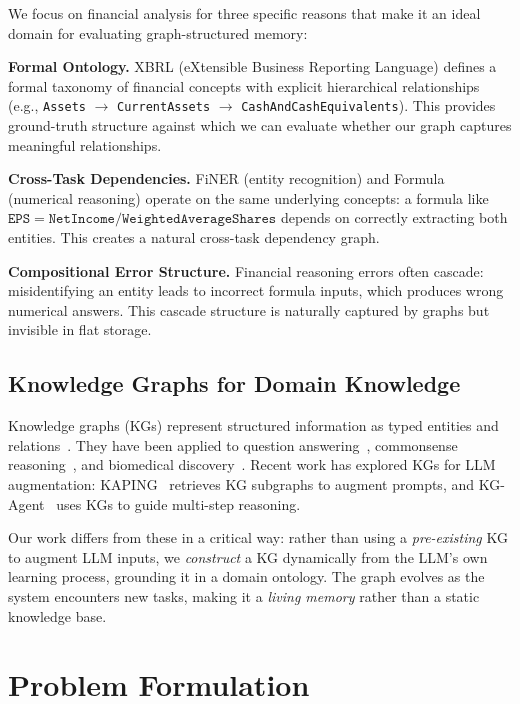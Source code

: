 \documentclass[12pt,a4paper]{article}
\begin{document}
We focus on financial analysis for three specific reasons that make it an ideal domain for evaluating graph-structured memory:

\textbf{Formal Ontology.} XBRL (eXtensible Business Reporting Language) defines a formal taxonomy of financial concepts with explicit hierarchical relationships (e.g., \texttt{Assets} $\rightarrow$ \texttt{CurrentAssets} $\rightarrow$ \texttt{CashAndCashEquivalents}). This provides ground-truth structure against which we can evaluate whether our graph captures meaningful relationships.

\textbf{Cross-Task Dependencies.} FiNER (entity recognition) and Formula (numerical reasoning) operate on the same underlying concepts: a formula like $\texttt{EPS} = \texttt{NetIncome} / \texttt{WeightedAverageShares}$ depends on correctly extracting both entities. This creates a natural cross-task dependency graph.

\textbf{Compositional Error Structure.} Financial reasoning errors often cascade: misidentifying an entity leads to incorrect formula inputs, which produces wrong numerical answers. This cascade structure is naturally captured by graphs but invisible in flat storage.

\subsection{Knowledge Graphs for Domain Knowledge}

Knowledge graphs (KGs) represent structured information as typed entities and relations~\cite{hogan2021knowledge}. They have been applied to question answering~\cite{yasunaga2021qagnn}, commonsense reasoning~\cite{wang2021logic}, and biomedical discovery~\cite{zhu2023llms}. Recent work has explored KGs for LLM augmentation: KAPING~\cite{baek2023kaping} retrieves KG subgraphs to augment prompts, and KG-Agent~\cite{jiang2024kgagent} uses KGs to guide multi-step reasoning.

Our work differs from these in a critical way: rather than using a \textit{pre-existing} KG to augment LLM inputs, we \textit{construct} a KG dynamically from the LLM's own learning process, grounding it in a domain ontology. The graph evolves as the system encounters new tasks, making it a \textit{living memory} rather than a static knowledge base.

\section{Problem Formulation}
\label{sec:formulation}
\end{document}
